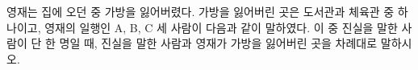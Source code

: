 영재는 집에 오던 중 가방을 잃어버렸다. 가방을 잃어버린 곳은 도서관과 체육관 중 하나이고, 영재의 일행인 A, B, C 세 사람이 다음과 같이 말하였다. 이 중 진실을 말한 사람이 단 한 명일 때, 진실을 말한 사람과 영재가 가방을 잃어버린 곳을 차례대로 말하시오.
